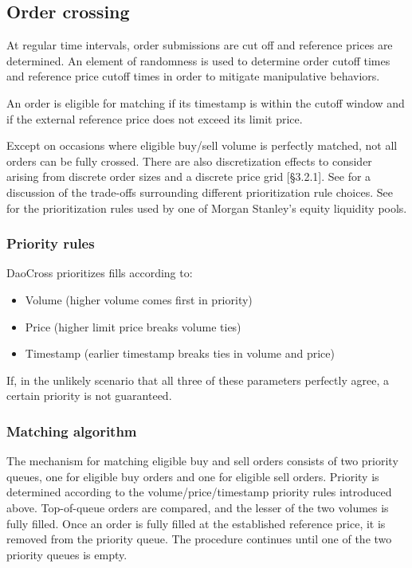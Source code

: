 \documentclass[11pt, reqno]{amsart}
\theoremstyle{definition}
\theoremstyle{remark}
\begin{document}
\subsection{Order crossing}
At regular time intervals, order submissions are cut off and reference prices
are determined. An element of randomness is used to determine order cutoff
times and reference price cutoff times in order to
mitigate manipulative behaviors.

An order is eligible for matching if its timestamp is within the cutoff window
and if the external reference price does not exceed its limit price.

Except on occasions where eligible buy/sell volume is perfectly matched, not
all orders can be fully crossed. There are also discretization effects to
consider arising from discrete order sizes and a discrete price grid
\cite{BoBoDoGo18}[\S 3.2.1].
See \cite{BeLaLiVa22} for a discussion of the trade-offs surrounding
different prioritization rule choices. See \cite{MsAts} for the
prioritization rules used by one of Morgan Stanley's equity liquidity pools.

\subsubsection{Priority rules}
DaoCross prioritizes fills according to:
\begin{itemize}
	\item Volume (higher volume comes first in priority)
	\item Price (higher limit price breaks volume ties)
	\item Timestamp (earlier timestamp breaks ties in volume and price)
\end{itemize}
If, in the unlikely scenario that all three of these parameters perfectly
agree, a certain priority is not guaranteed.

\subsubsection{Matching algorithm}
The mechanism for matching eligible buy and sell orders consists of two
priority queues, one for eligible buy orders and one for eligible sell orders.
Priority is determined according to the volume/price/timestamp priority rules
introduced above. Top-of-queue orders are compared, and the lesser of the two
volumes is fully filled. Once an order is fully filled at the established
reference price, it is removed from the priority queue. The procedure continues
until one of the two priority queues is empty.
\end{document}
